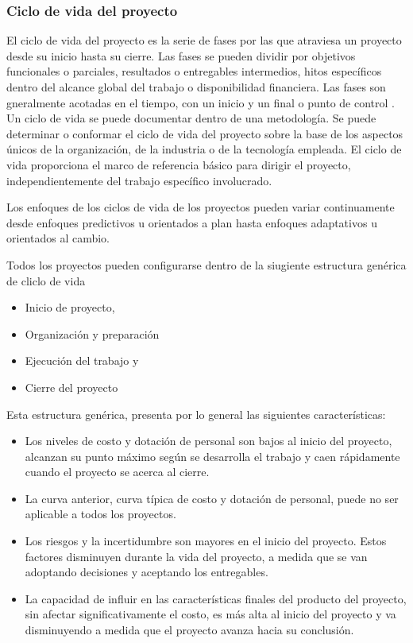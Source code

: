 \subsubsection{Ciclo de vida del proyecto}

El ciclo de vida del proyecto es la serie de fases por las que atraviesa un proyecto desde su inicio hasta su cierre. Las fases se pueden dividir por objetivos funcionales o parciales, resultados o entregables intermedios, hitos específicos dentro del alcance global del trabajo o disponibilidad financiera. Las fases son gneralmente acotadas en el tiempo, con un inicio y un final o punto de control . Un ciclo de vida se puede documentar dentro de una metodología. Se puede determinar o conformar el ciclo de vida del proyecto sobre la base de los aspectos únicos de la organización, de la industria o de la tecnología empleada. El ciclo de vida proporciona el marco de referencia básico para dirigir el proyecto, independientemente del trabajo específico involucrado.

Los enfoques de los ciclos de vida de los proyectos pueden variar continuamente desde enfoques predictivos u orientados a plan hasta enfoques adaptativos u orientados al cambio.

Todos los proyectos pueden configurarse dentro de la siugiente estructura genérica de cliclo de vida

\begin{itemize}
\item{Inicio de proyecto,}
\item{Organización y preparación}
\item{Ejecución del trabajo y}
\item{Cierre del proyecto}
\end{itemize}

Esta estructura genérica, presenta por lo general las siguientes características:

\begin{itemize}
\item{Los  niveles  de  costo  y  dotación  de  personal  son  bajos  al  inicio  del  proyecto,  alcanzan  su  punto  
máximo según se desarrolla el trabajo y caen rápidamente cuando el proyecto se acerca al cierre.}

\item{La curva anterior, curva típica de costo y dotación de personal, puede no ser aplicable a todos los 
proyectos.}

\item{Los  riesgos  y  la  incertidumbre son  mayores  en  el  inicio  del  
proyecto. Estos factores disminuyen durante la vida del proyecto, a medida que se van adoptando 
decisiones y aceptando los entregables.}

\item{La  capacidad  de  influir  en  las  características  finales  del  producto  del  proyecto,  sin  afectar  
significativamente  el  costo,  es  más  alta  al  inicio  del  proyecto  y  va  disminuyendo  a  medida  que  
el  proyecto  avanza  hacia  su  conclusión.}

\end{itemize}

